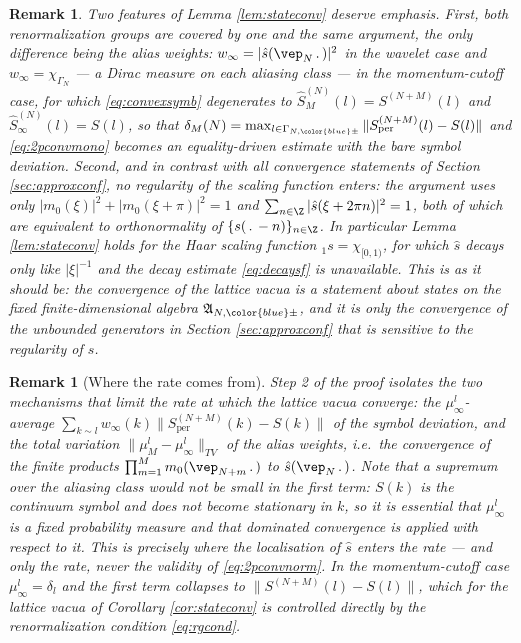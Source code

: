 \documentclass[a4paper, 11pt]{article}
\newcommand{\fA}{\mathfrak{A}}\newcommand{\cA}{\mathcal{A}}\newcommand{\dA}{\mathds{A}}\newcommand{\sA}{\mathscr{A}}
\DeclareMathOperator{\1}{\mathds{1}}
\DeclareMathOperator{\per}{per}
\newtheorem{rem}[thm]{Remark}
\begin{document}
\begin{rem}
\label{rem:stateconv}
Two features of Lemma \ref{lem:stateconv} deserve emphasis. First, both renormalization groups are covered by one and the same argument, the only difference being the alias weights: $w_{\infty}=|\hat{s}(\vep_{N}\!\ .\!\ )|^{2}$ in the wavelet case and $w_{\infty}=\chi_{\Gamma_{N}}$ --- a Dirac measure on each aliasing class --- in the momentum-cutoff case, for which \eqref{eq:convexsymb} degenerates to $\hat{S}^{(N)}_{M}(l)=S^{(N+M)}(l)$ and $\hat{S}^{(N)}_{\infty}(l)=S(l)$, so that $\delta_{M}(N)=\max_{l\in\Gamma_{N,{\color{blue}\pm}}}\|S^{(N+M)}_{\per}(l)-S(l)\|$ and \eqref{eq:2pconvmono} becomes an equality-driven estimate with the bare symbol deviation. Second, and in contrast with all convergence statements of Section \ref{sec:approxconf}, \emph{no regularity of the scaling function enters}: the argument uses only $|m_{0}(\xi)|^{2}+|m_{0}(\xi+\pi)|^{2}=1$ and $\sum_{n\in\Z}|\hat{s}(\xi+2\pi n)|^{2}=1$, both of which are equivalent to orthonormality of $\{s(\!\ .\!\ -n)\}_{n\in\Z}$. In particular Lemma \ref{lem:stateconv} holds for the Haar scaling function $_{1}s=\chi_{[0,1)}$, for which $\hat{s}$ decays only like $|\xi|^{-1}$ and the decay estimate \eqref{eq:decaysf} is unavailable. This is as it should be: the convergence of the lattice vacua is a statement about states on the fixed finite-dimensional algebra $\fA_{N,{\color{blue}\pm}}$, and it is only the convergence of the \emph{unbounded} generators in Section \ref{sec:approxconf} that is sensitive to the regularity of $s$.
\end{rem}

\begin{rem}[Where the rate comes from]
\label{rem:staterate}
Step 2 of the proof isolates the two mechanisms that limit the rate at which the lattice vacua converge: the $\mu^{l}_{\infty}$-average $\sum_{k\sim l}w_{\infty}(k)\|S^{(N+M)}_{\per}(k)-S(k)\|$ of the symbol deviation, and the total variation $\|\mu^{l}_{M}-\mu^{l}_{\infty}\|_{TV}$ of the alias weights, i.e.~the convergence of the finite products $\prod_{m=1}^{M}m_{0}(\vep_{N+m}\!\ .\!\ )$ to $\hat{s}(\vep_{N}\!\ .\!\ )$. Note that a supremum over the aliasing class would \emph{not} be small in the first term: $S(k)$ is the continuum symbol and does not become stationary in $k$, so it is essential that $\mu^{l}_{\infty}$ is a fixed probability measure and that dominated convergence is applied with respect to it. This is precisely where the localisation of $\hat{s}$ enters the \emph{rate} --- and only the rate, never the validity of \eqref{eq:2pconvnorm}. In the momentum-cutoff case $\mu^{l}_{\infty}=\delta_{l}$ and the first term collapses to $\|S^{(N+M)}(l)-S(l)\|$, which for the lattice vacua of Corollary \ref{cor:stateconv} is controlled directly by the renormalization condition \eqref{eq:rgcond}.
\end{rem}
\end{document}
